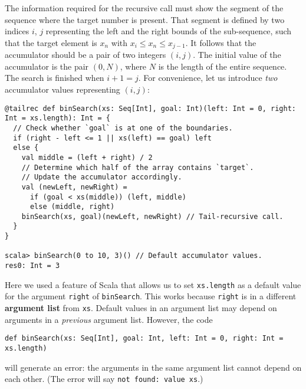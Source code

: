 The information required for the recursive call must show the segment
of the sequence where the target number is present. That segment is
defined by two indices $i$, $j$ representing the left and the right
bounds of the sub-sequence, such that the target element is $x_{n}$
with $x_{i}\leq x_{n}\leq x_{j-1}$. It follows that the accumulator
should be a pair of two integers $\left(i,j\right)$. The initial
value of the accumulator is the pair $\left(0,N\right)$, where $N$
is the length of the entire sequence. The search is finished when
$i+1=j$. For convenience, let us introduce \emph{two} accumulator
values representing $\left(i,j\right)$:
\begin{lstlisting}
@tailrec def binSearch(xs: Seq[Int], goal: Int)(left: Int = 0, right: Int = xs.length): Int = {
  // Check whether `goal` is at one of the boundaries.
  if (right - left <= 1 || xs(left) == goal) left
  else {
    val middle = (left + right) / 2
    // Determine which half of the array contains `target`.
    // Update the accumulator accordingly.
    val (newLeft, newRight) =
      if (goal < xs(middle)) (left, middle)
      else (middle, right)
    binSearch(xs, goal)(newLeft, newRight) // Tail-recursive call.
  }
}

scala> binSearch(0 to 10, 3)() // Default accumulator values.
res0: Int = 3
\end{lstlisting}
Here we used a feature of Scala that allows us to set \lstinline!xs.length!
as a default value for the argument \lstinline!right! of \lstinline!binSearch!.
This works because \lstinline!right! is in a different \textbf{argument
list} from \lstinline!xs!. Default values in
an argument list may depend on arguments in a \emph{previous} argument
list. However, the code
\begin{lstlisting}
def binSearch(xs: Seq[Int], goal: Int, left: Int = 0, right: Int = xs.length)
\end{lstlisting}
will generate an error: the arguments in the same argument list cannot
depend on each other. (The error will say \lstinline!not found: value xs!.)

